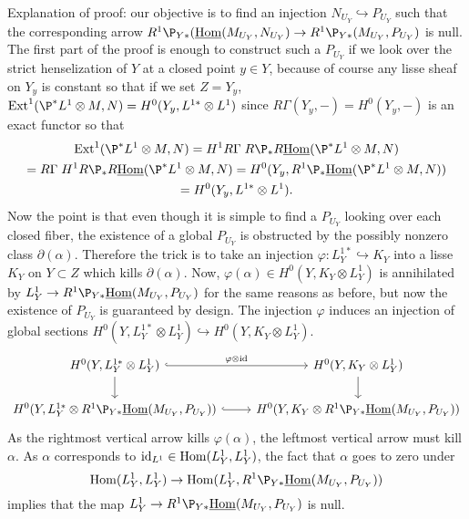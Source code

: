 \documentclass[deligne.tex]{subfiles}
\begin{document}
Explanation of proof: our objective is to find an injection
$N_{U_Y}\hookrightarrow P_{U_Y}$ such that the corresponding arrow
$R^1\P_{Y*}(\underline\Hom(M_{U_Y},N_{U_Y})\ra R^1\P_{Y*}(M_{U_Y},P_{U_Y})$
is null. The first part of the proof is enough to construct such a $P_{U_Y}$
if we look over the strict henselization of $Y$ at a closed point
$y\in Y$, because of course any lisse sheaf on $Y_y$ is constant so that if
we set $Z=Y_y$,
$\Ext^1(\P^*L^1\otimes M,N)=H^0(Y_y,L^{1*}\otimes L^1)$
since $R\Gamma(Y_y,-)=H^0(Y_y,-)$ is an exact functor so that
\begin{multline*}
	\Ext^1(\P^*L^1\otimes M,N)
	=H^1R\Gamma\; R\P_*R\underline\Hom(\P^*L^1\otimes M,N) \\
	=R\Gamma\;H^1R\P_*R\underline\Hom(\P^*L^1\otimes M,N)
	=H^0(Y_y,R^1\P_*\underline\Hom(\P^*L^1\otimes M,N)) \\
	=H^0(Y_y,L^{1*}\otimes L^1).
\end{multline*}
Now the point is that even though it is simple to find a $P_{U_Y}$ looking
over each closed fiber, the existence of a global $P_{U_Y}$ is 
obstructed by the possibly nonzero class
$\partial(\alpha)$. Therefore the trick is to take an injection
$\varphi:L^{1*}_Y\hookrightarrow K_Y$ into a lisse $K_Y$ on $Y\subset Z$
which kills $\partial(\alpha)$.
Now, $\varphi(\alpha)\in H^0(Y,K_Y\otimes L^1_Y)$ is annihilated by
$L^1_Y\ra R^1\P_{Y*}\underline\Hom(M_{U_Y},P_{U_Y})$ for the same reasons as
before, but now the existence of $P_{U_Y}$ is guaranteed by design. The
injection $\varphi$ induces an injection of global sections
$H^0(Y,L^{1*}_Y\otimes L^1_Y)\hookrightarrow H^0(Y,K_Y\otimes L^1_Y)$.
\begin{equation*}\begin{tikzcd}
	H^0(Y,L^{1*}_Y\otimes L^1_Y)\arrow[r,"\varphi\otimes\id",hook]\arrow[d]
	& H^0(Y,K_Y\otimes L^1_Y)\arrow[d] \\
	H^0(Y,L^{1*}_Y\otimes R^1\P_{Y*}\underline\Hom(M_{U_Y},P_{U_Y}))
	\arrow[r,hook]
	& H^0(Y,K_Y\otimes R^1\P_{Y*}\underline\Hom(M_{U_Y},P_{U_Y}))
\end{tikzcd}\end{equation*}
As the rightmost vertical arrow kills $\varphi(\alpha)$, the leftmost
vertical arrow must kill $\alpha$. As $\alpha$ corresponds to
$\operatorname{id}_{L^1}\in\operatorname{Hom}(L^1_Y,L^1_Y)$, the fact that $\alpha$ goes to zero under
\begin{equation*}
	\Hom(L^1_Y,L^1_Y)\ra\Hom(L^1_Y,R^1\P_{Y*}\underline\Hom(M_{U_Y},P_{U_Y}))
\end{equation*}
implies that the map $L^1_Y\ra R^1\P_{Y*}\underline\Hom(M_{U_Y},P_{U_Y})$
is null.
\end{document}
